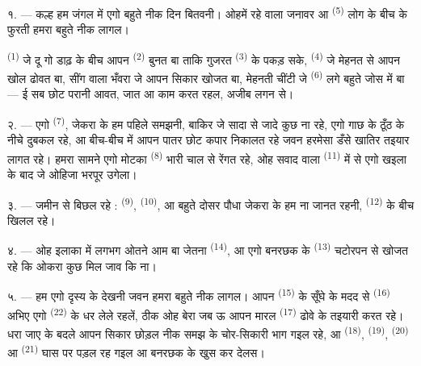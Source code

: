 \VUsaut{3.0mm}
\VUsaut{3.0mm}

\VUsaut{3.0mm}

१. --- कल्ह हम जंगल में एगो बहुते नीक दिन बितवनी। ओहमें रहे वाला
जनावर आ  \textsuperscript{(5)} लोग के बीच के फुरती हमरा
बहुते नीक लागल।

 \textsuperscript{(1)} जे दू गो डाढ़ के बीच आपन
 \textsuperscript{(2)} बुनत बा ताकि गुजरत 
\textsuperscript{(3)} के पकड़ सके,  \textsuperscript{(4)} जे
मेहनत से आपन खोल ढोवत बा, सींग वाला भँवरा जे आपन सिकार खोजत बा, मेहनती
चींटी जे  \textsuperscript{(6)} लगे बहुते जोस में
बा — ई सब छोट परानी आवत, जात आ काम करत रहल, अजीब लगन से।

२. --- एगो  \textsuperscript{(7)}, जेकरा के हम पहिले
 समझनी, बाकिर जे सादा  से जादे कुछ ना रहे,
एगो गाछ के ठूँठ के नीचे दुबकल रहे, आ बीच-बीच में आपन पातर छोट कपार
निकालत रहे जवन हरमेसा डँसे खातिर तइयार लागत रहे। हमरा सामने एगो मोटका
 \textsuperscript{(8)} भारी चाल से रेंगत रहे, ओह
सवाद वाला  \textsuperscript{(11)} में से एगो
खइला के बाद जे ओहिजा भरपूर उगेला।

३. --- जमीन  से बिछल रहे : 
\textsuperscript{(9)},  \textsuperscript{(10)}, आ बहुते
दोसर पौधा जेकरा के हम ना जानत रहनी, 
\textsuperscript{(12)} के बीच खिलल रहे।

४. --- ओह इलाका में  लगभग ओतने आम बा जेतना
 \textsuperscript{(14)}, आ एगो बनरछक के
 \textsuperscript{(13)} चटोरपन से खोजत रहे कि ओकरा
कुछ मिल जाव कि ना।

\VUsaut{3.0mm}
\VUsaut{3.0mm}

५. --- हम एगो दृस्य के  देखनी जवन हमरा बहुते नीक लागल।
आपन  \textsuperscript{(15)} के सूँघे के मदद से
 \textsuperscript{(16)} अभिए एगो 
\textsuperscript{(22)} के धर लेले रहलें, ठीक ओह बेरा जब ऊ आपन मारल
 \textsuperscript{(17)} ढोवे के तइयारी करत रहे। धरा जाए के
बदले आपन सिकार छोड़ल नीक समझ के चोर-सिकारी भाग गइल रहे, आ
 \textsuperscript{(18)},  \textsuperscript{(19)},
 \textsuperscript{(20)} आ 
\textsuperscript{(21)} घास पर पड़ल रह गइल आ बनरछक के खुस कर देलस।

